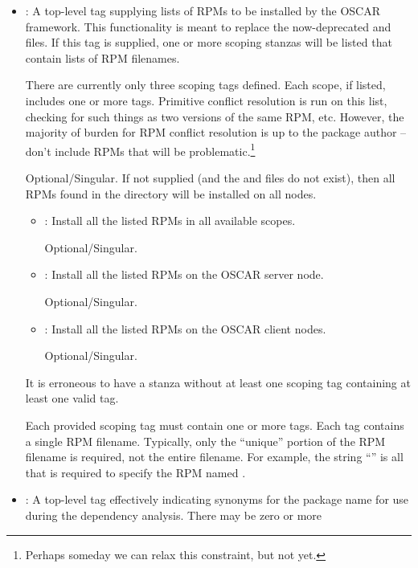 \begin{itemize}
\item {}: A top-level tag supplying lists of RPMs to be
  installed by the OSCAR framework.  This functionality is meant to
  replace the now-deprecated  and
   files.  If this tag is supplied, one or more
  scoping stanzas will be listed that contain lists of RPM filenames.  
    
  There are currently only three scoping tags defined.  Each scope, if
  listed, includes one or more  tags.  Primitive conflict
  resolution is run on this list, checking for such things as two
  versions of the same RPM, etc.  However, the majority of burden for
  RPM conflict resolution is up to the package author -- don't include
  RPMs that will be problematic.\footnote{Perhaps someday we can relax
    this constraint, but not yet.}

  Optional/Singular.  If not supplied (and the 
  and  files do not exist), then all RPMs found
  in the  directory will be installed on all nodes.  
  
  \begin{itemize}
  \item {}: Install all the listed RPMs in all available
    scopes.

    Optional/Singular.
    
  \item {}: Install all the listed RPMs on the OSCAR
    server node.

    Optional/Singular.
    
  \item {}: Install all the listed RPMs on the OSCAR
    client nodes.

    Optional/Singular.
  \end{itemize}
  
  It is erroneous to have a  stanza without at least
  one scoping tag containing at least one valid  tag.
  
  Each provided scoping tag must contain one or more 
  tags.  Each  tag contains a single RPM filename.
  Typically, only the ``unique'' portion of the RPM filename is
  required, not the entire filename.  For example, the string
  ``'' is all that is required to specify the RPM
  named .

\item {}: A top-level tag effectively indicating
  synonyms for the package name for use during the dependency
  analysis.  There may be zero or more  
  

\end{itemize}
